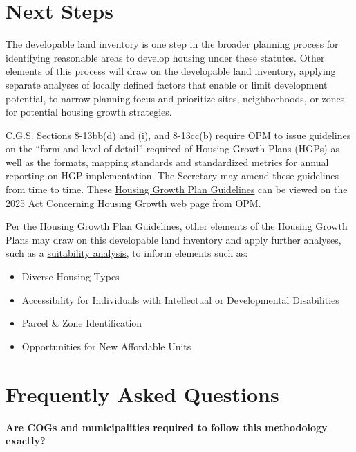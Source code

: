 \documentclass[
  letterpaper,
  DIV=11,
  numbers=noendperiod]{scrreprt}
\providecommand{\tightlist}{%
  \setlength{\itemsep}{0pt}\setlength{\parskip}{0pt}}
\begin{document}

\chapter{Next Steps}\label{next-steps-1}

The developable land inventory is one step in the broader planning
process for identifying reasonable areas to develop housing under these
statutes. Other elements of this process will draw on the developable
land inventory, applying separate analyses of locally defined factors
that enable or limit development potential, to narrow planning focus and
prioritize sites, neighborhoods, or zones for potential housing growth
strategies.

C.G.S. Sections 8-13bb(d) and (i), and 8-13cc(b) require OPM to issue
guidelines on the ``form and level of detail'' required of Housing
Growth Plans (HGPs) as well as the formats, mapping standards and
standardized metrics for annual reporting on HGP implementation. The
Secretary may amend these guidelines from time to time. These
\hyperref[0]{Housing Growth Plan Guidelines} can be viewed on the
\hyperref[0]{2025 Act Concerning Housing Growth web page} from OPM.

Per the Housing Growth Plan Guidelines, other elements of the Housing
Growth Plans may draw on this developable land inventory and apply
further analyses, such as a
\href{https://housingmaps.ct.gov/pages/suitability-analysis}{suitability
analysis}, to inform elements such as:

\begin{itemize}
\tightlist
\item
  Diverse Housing Types
\item
  Accessibility for Individuals with Intellectual or Developmental
  Disabilities
\item
  Parcel \& Zone Identification
\item
  Opportunities for New Affordable Units
\end{itemize}

\cleardoublepage
{}
{}
\appendix

\chapter{Frequently Asked Questions}\label{frequently-asked-questions}

\textbf{Are COGs and municipalities required to follow this methodology
exactly?}
\end{document}
